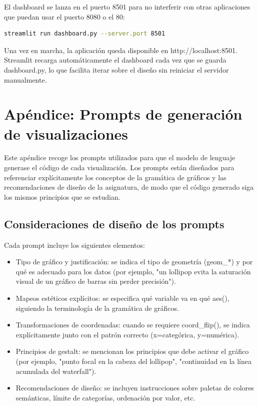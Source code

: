 \documentclass[spanish,a4paper,12pt,oneside]{extreport}
\begin{document}
El dashboard se lanza en el puerto 8501 para no interferir con otras aplicaciones que puedan usar el puerto 8080 o el 80:

\begin{lstlisting}[language=bash,caption={Arranque del dashboard.}]
streamlit run dashboard.py --server.port 8501
\end{lstlisting}

Una vez en marcha, la aplicación queda disponible en http://localhost:8501. Streamlit recarga automáticamente el dashboard cada vez que se guarda dashboard.py, lo que facilita iterar sobre el diseño sin reiniciar el servidor manualmente.


\chapter*{Apéndice: Prompts de generación de visualizaciones}

Este apéndice recoge los prompts utilizados para que el modelo de lenguaje generase el código de cada visualización. Los prompts están diseñados para referenciar explícitamente los conceptos de la gramática de gráficos y las recomendaciones de diseño de la asignatura, de modo que el código generado siga los mismos principios que se estudian.

\section*{Consideraciones de diseño de los prompts}

Cada prompt incluye los siguientes elementos:

\begin{itemize}
  \item Tipo de gráfico y justificación: se indica el tipo de geometría (geom\_*) y por qué es adecuado para los datos (por ejemplo, "un lollipop evita la saturación visual de un gráfico de barras sin perder precisión").
  \item Mapeos estéticos explícitos: se especifica qué variable va en qué aes(), siguiendo la terminología de la gramática de gráficos.
  \item Transformaciones de coordenadas: cuando se requiere coord\_flip(), se indica explícitamente junto con el patrón correcto (x=categórica, y=numérica).
  \item Principios de gestalt: se mencionan los principios que debe activar el gráfico (por ejemplo, "punto focal en la cabeza del lollipop", "continuidad en la línea acumulada del waterfall").
  \item Recomendaciones de diseño: se incluyen instrucciones sobre paletas de colores semánticas, límite de categorías, ordenación por valor, etc.
\end{itemize}
\end{document}
